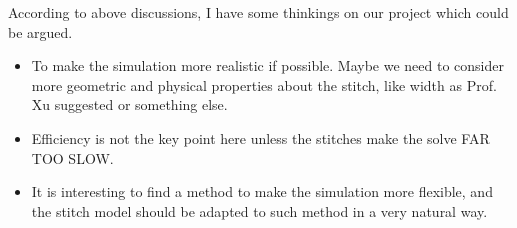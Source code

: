 \documentclass[a4paper,10pt]{article}
\begin{document}
According to above discussions, I have some thinkings on our project which could be argued.

\begin{itemize}
 \item To make the simulation more realistic if possible. Maybe we need to consider more geometric and physical properties about the stitch, like width as Prof. Xu suggested or something else.
 \item Efficiency is not the key point here unless the stitches make the solve FAR TOO SLOW.
 \item It is interesting to find a method to make the simulation more flexible, and the stitch model 
 should be adapted to such method in a very natural way.
\end{itemize}
\end{document}
